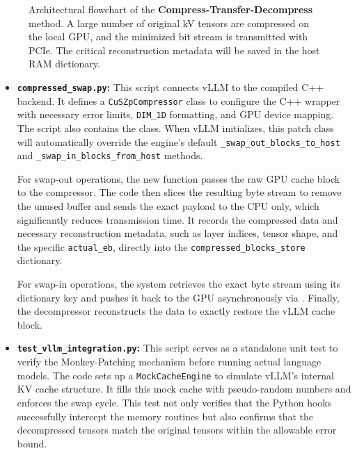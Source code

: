 \documentclass{polyu-comp}
\begin{document}
\begin{figure}[htbp]
    \caption{Architectural flowchart of the \textbf{Compress-Transfer-Decompress} method. A large number of original kV tensors are compressed on the local GPU, and the minimized bit stream is transmitted with PCIe. The critical reconstruction metadata will be saved in the host RAM dictionary.}
    \label{fig:pipeline_diagram}
\end{figure}

\begin{itemize}
    \item \textbf{\texttt{compressed\_swap.py}:} This script connects vLLM to the compiled C++ backend. It defines a \texttt{CuSZpCompressor} class to configure the C++ wrapper with necessary error limits, \texttt{DIM\_1D} formatting, and GPU device mapping. The script also contains the  class. When vLLM initializes, this patch class will automatically override the engine's default \texttt{\_swap\_out\_blocks\_to\_host} and \texttt{\_swap\_in\_blocks\_from\_host} methods. 
    
    For swap-out operations, the new function passes the raw GPU cache block to the compressor. The code then slices the resulting byte stream to remove the unused buffer and sends the exact payload to the CPU only, which significantly reduces transmission time. It records the compressed data and necessary reconstruction metadata, such as layer indices, tensor shape, and the specific \texttt{actual\_eb}, directly into the \texttt{compressed\_blocks\_store} dictionary. 
    
    For swap-in operations, the system retrieves the exact byte stream using its dictionary key and pushes it back to the GPU asynchronously via . Finally, the decompressor reconstructs the data to exactly restore the vLLM cache block.

    \item \textbf{\texttt{test\_vllm\_integration.py}:} This script serves as a standalone unit test to verify the Monkey-Patching mechanism before running actual language models. The code sets up a \texttt{MockCacheEngine} to simulate vLLM's internal KV cache structure. It fills this mock cache with pseudo-random numbers and enforces the swap cycle. This test not only verifies that the Python hooks successfully intercept the memory routines but also confirms that the decompressed tensors match the original tensors within the allowable error bound.
\end{itemize}
\end{document}
